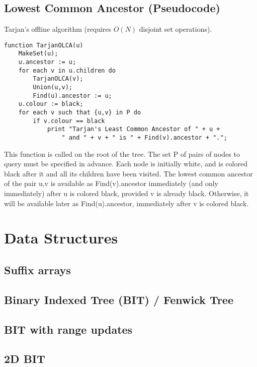 \documentclass[10pt]{extarticle}
\begin{document}
\begin{multicols*}{3}
\subsection{Lowest Common Ancestor (Pseudocode)} %
Tarjan's offline algorithm (requires $O(N)$ disjoint set operations).
\begin{lstlisting}
function TarjanOLCA(u)
    MakeSet(u);
    u.ancestor := u;
    for each v in u.children do
        TarjanOLCA(v);
        Union(u,v);
        Find(u).ancestor := u;
    u.colour := black;
    for each v such that {u,v} in P do
        if v.colour == black
            print "Tarjan's Least Common Ancestor of " + u +
                " and " + v + " is " + Find(v).ancestor + ".";
\end{lstlisting}
This function is called on the root of the tree. The set P of pairs of nodes to
query must be specified in advance. Each node is initially white, and is
colored black after it and all its children have been visited. The lowest
common ancestor of the pair {u,v} is available as Find(v).ancestor immediately
(and only immediately) after u is colored black, provided v is already black.
Otherwise, it will be available later as Find(u).ancestor, immediately after v
is colored black.

\section{Data Structures}

\subsection{Suffix arrays} %


\subsection{Binary Indexed Tree (BIT) / Fenwick Tree} %


\subsection{BIT with range updates} %


\subsection{2D BIT}



\end{multicols*}
\end{document}
